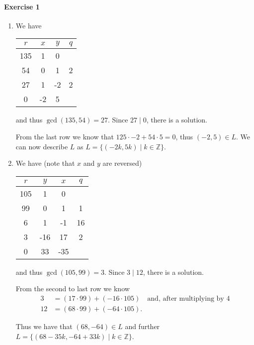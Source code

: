 \documentclass{article}
\begin{document}
\paragraph{Exercise 1}

\begin{enumerate}
    \item We have
    \begin{center}
        \begin{tabular}{c | c c | c}
            $r$ & $x$ & $y$ & $q$ \\\midrule
            135 & 1 & 0 & \\
            54 & 0 & 1 & 2 \\
            27 & 1 & -2 & 2 \\ 
            0 & -2 & 5 & \\ 
        \end{tabular}
    \end{center}
    and thus $\gcd(135, 54) = 27$. Since $27 \mid 0$, there is a solution.

    From the last row we know that $125 \cdot -2 + 54 \cdot 5 = 0$, thus $(-2, 5) \in L$. We can now describe $L$ as $L = \{(-2k, 5k) \mid k \in \mathbb{Z}\}$.

    \item We have (note that $x$ and $y$ are reversed)
    \begin{center}
        \begin{tabular}{c | c c | c}
            $r$ & $y$ & $x$ & $q$ \\\midrule
            105 & 1 & 0 & \\
            99 & 0 & 1 & 1 \\
            6 & 1 & -1 & 16 \\ 
            3 & -16 & 17 & 2 \\ 
            0 & 33 & -35 & \\ 
        \end{tabular}
    \end{center}
    and thus $\gcd(105, 99) = 3$. Since $3 \mid 12$, there is a solution.
    
    From the second to last row we know
    \begin{align*}
        3  &= (17 \cdot 99) + (-16 \cdot 105) \quad \text{and, after multiplying by 4}\\
        12 &= (68 \cdot 99) + (-64 \cdot 105).
    \end{align*}

    Thus we have that $(68, -64) \in L$ and further $L = \{(68 - 35k, -64 + 33k) \mid k \in \mathbb{Z}\}$.


\end{enumerate}
\end{document}
